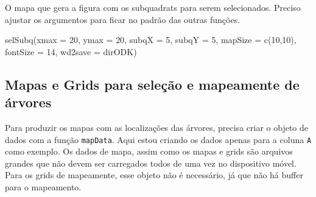 \documentclass[
  letterpaper,
]{report}
\newenvironment{Shaded}{\begin{snugshade}}{\end{snugshade}}
\newcommand{\AttributeTok}[1]{\textcolor[rgb]{0.40,0.45,0.13}{#1}}
\newcommand{\DecValTok}[1]{\textcolor[rgb]{0.68,0.00,0.00}{#1}}
\newcommand{\FunctionTok}[1]{\textcolor[rgb]{0.28,0.35,0.67}{#1}}
\newcommand{\NormalTok}[1]{\textcolor[rgb]{0.00,0.23,0.31}{#1}}
\begin{document}
O mapa que gera a figura com os subquadrats para serem selecionados.
Preciso ajustar os argumentos para ficar no padrão das outras funções.

\begin{Shaded}
\begin{Highlighting}[]
\FunctionTok{selSubq}\NormalTok{(}\AttributeTok{xmax =} \DecValTok{20}\NormalTok{, }\AttributeTok{ymax =} \DecValTok{20}\NormalTok{, }\AttributeTok{subqX =} \DecValTok{5}\NormalTok{, }\AttributeTok{subqY =} \DecValTok{5}\NormalTok{, }\AttributeTok{mapSize =} \FunctionTok{c}\NormalTok{(}\DecValTok{10}\NormalTok{,}\DecValTok{10}\NormalTok{), }\AttributeTok{fontSize =} \DecValTok{14}\NormalTok{, }\AttributeTok{wd2save =}\NormalTok{ dirODK)}
\end{Highlighting}
\end{Shaded}

\subsection{Mapas e Grids para seleção e mapeamente de
árvores}\label{mapas-e-grids-para-seleuxe7uxe3o-e-mapeamente-de-uxe1rvores}

Para produzir os mapas com as localizações das árvores, precisa criar o
objeto de dados com a função \texttt{mapData}. Aqui estou criando os
dados apenas para a coluna \texttt{A} como exemplo. Os dados de mapa,
assim como os mapas e grids são arquivos grandes que não devem ser
carregados todos de uma vez no dispositivo móvel. Para os grids de
mapeamente, esse objeto não é necessário, já que não há buffer para o
mapeamento.
\end{document}
